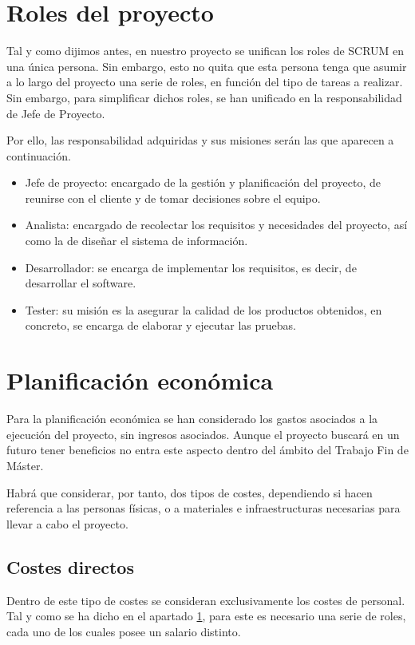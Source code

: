 \section{Roles del proyecto}\label{sec:roles_proyecto}

Tal y como dijimos antes, en nuestro proyecto se unifican los roles de SCRUM en una única persona. Sin embargo, esto no quita que esta persona tenga que asumir a lo largo del proyecto una serie de roles, en función del tipo de tareas a realizar. Sin embargo, para simplificar dichos roles, se han unificado en la responsabilidad de Jefe de Proyecto.

Por ello, las responsabilidad adquiridas y sus misiones serán las que aparecen a continuación.
\begin{itemize}
    \item Jefe de proyecto: encargado de la gestión y planificación del proyecto, de reunirse con el cliente y de tomar decisiones sobre el equipo.
    \item Analista: encargado de recolectar los requisitos y necesidades del proyecto, así como la de diseñar el sistema de información.
    \item Desarrollador: se encarga de implementar los requisitos, es decir, de desarrollar el software.
    \item Tester: su misión es la asegurar la calidad de los productos obtenidos, en concreto, se encarga de elaborar y ejecutar las pruebas.
\end{itemize}

\section{Planificación económica}\label{sec:planificacion_economica}

Para la planificación económica se han considerado los gastos asociados a la ejecución del proyecto, sin ingresos asociados. Aunque el proyecto buscará en un futuro tener beneficios no entra este aspecto dentro del ámbito del Trabajo Fin de Máster.

Habrá que considerar, por tanto, dos tipos de costes, dependiendo si hacen referencia a las personas físicas, o a materiales e infraestructuras necesarias para llevar a cabo el proyecto.

\subsection{Costes directos}
Dentro de este tipo de costes se consideran exclusivamente los costes de personal. Tal y como se ha dicho en el apartado \ref{sec:roles_proyecto}, para este es necesario una serie de roles, cada uno de los cuales posee un salario distinto.

